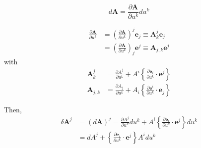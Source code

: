 \begin{equation}
d\mathbf{A}=\frac{\partial\mathbf{A}}{\partial u^{k}}du^{k}
\end{equation}

\begin{align}
\frac{\partial\mathbf{A}}{\partial u^{k}} & =\left( \frac{\partial \mathbf{A}%
}{ \partial u^{k}}\right) ^{j}\mathbf{e}_{j}\equiv\mathbf{A}_{k}^{j}\mathbf{e%
}_{j} \\
& =\left( \frac{\partial\mathbf{A}}{\partial u^{k}}\right) _{j}\mathbf{e}
^{j}\equiv\mathbf{A}_{j,k}\mathbf{e}^{j}
\end{align}
with 
\begin{align}
\mathbf{A}_{k}^{j} & =\frac{\partial A^{j}}{\partial u^{k}}+A^{i}\left\{ 
\frac{ \partial\mathbf{e}_{i}}{\partial u^{k}}\cdot\mathbf{e}^{j}\right\} \\
\mathbf{A}_{j,k} & =\frac{\partial A_{j}}{\partial u^{k}}+A_{i}\left\{ \frac{
\partial\mathbf{e}^{i}}{\partial u^{k}}\cdot\mathbf{e}_{j}\right\}
\end{align}

Then, 
\begin{align}
\delta\mathbf{A}^{j} & =\left( d\mathbf{A}\right) ^{j}=\frac{\partial A^{j}}{
\partial u^{k}}du^{k}+A^{i}\left\{ \frac{\partial\mathbf{e}_{i}}{\partial
u^{k}}\cdot\mathbf{e}^{j}\right\} du^{k} \\
& =dA^{j}+\left\{ \frac{\partial\mathbf{e}_{i}}{\partial u^{k}}\cdot\mathbf{e%
}^{j}\right\} A^{i}du^{k}
\end{align}

